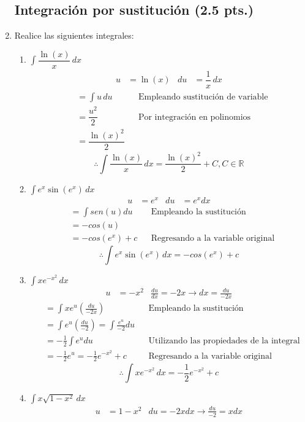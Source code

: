 \documentclass[letterpaper]{article}
\newcommand{\R}{\mathds{R}}
\renewcommand{\*}{\cdot}
\theoremstyle{definition}
\begin{document}
\begin{enumerate}
\subsection*{Integración por sustitución (2.5 pts.)}
\item  Realice las siguientes integrales:
\begin{enumerate}
\item$\displaystyle \int \dfrac{\ln(x)}{x} \, dx$
\begin{align*}
	u & = \ln(x) & du &= \dfrac{1}{x}\,dx
\end{align*}
\begin{align*}
	&= \int u\,du &&\text{Empleando sustitución de variable}\\
	&= \dfrac{u^2}{2} &&\text{Por integración en polinomios}\\
	&= \dfrac{\ln(x)^2}{2}
\end{align*}
\[ \therefore \int \dfrac{\ln(x)}{x} \, dx = \dfrac{\ln(x)^2}{2} + C, C \in \R \]
\item$\displaystyle \int e^x \sin(e^x) \, dx$
\begin{align*}
	u &= e^{x} & du &= e^{x} dx
\end{align*}
\begin{align*}
	&= \int sen(u) du &&\text{Empleando la sustitución}\\
	&= -cos(u)\\
	&= -cos(e^{x})+c &&\text{Regresando a la variable original}
\end{align*}
\[\therefore \int e^x \sin(e^x) \, dx = -cos(e^{x})+c \]
\item$\displaystyle \int xe^{-x^2} \, dx$
\begin{align*}
	u &= -x^{2} & \frac{du}{dx}=-2x \rightarrow dx=\frac{du}{-2x}
\end{align*}
\begin{align*}
	&= \int xe^{u}(\frac{du}{-2x}) &&\text{Empleando la sustitución}\\
	&= \int e^{u}(\frac{du}{-2}) = \int \frac{e^{u}}{-2}du\\
	&= -\frac{1}{2}\int e^{u} du &&\text{Utilizando las propiedades de la integral}\\
	&=-\frac{1}{2} e^{u} = -\frac{1}{2} e^{-x^{2}}+c &&\text{Regresando a la variable original}
\end{align*}
\[\therefore \int xe^{-x^2} \, dx = -\frac{1}{2} e^{-x^{2}}+c \]
\item$\displaystyle \int x\sqrt{1- x^2} \, dx$
\begin{align*}
	u &= 1-x^{2} & du = -2x dx \rightarrow \frac{du}{-2}= x dx

\end{align*}
\end{enumerate}
\end{enumerate}
\end{document}
